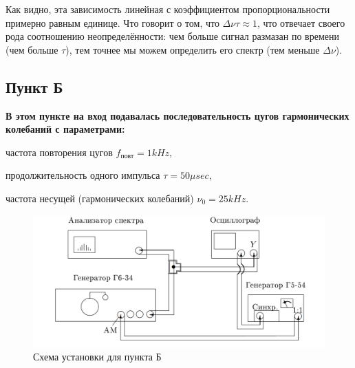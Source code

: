 \documentclass[a4paper,12pt]{article}
\begin{document}
Как видно, эта зависимость линейная с коэффициентом пропорциональности примерно равным единице. Что говорит о том, что $\Delta \nu \tau \approx 1$, что отвечает своего рода соотношению неопределённости: чем больше сигнал размазан по времени (чем больше $\tau$), тем точнее мы можем определить его спектр (тем меньше $\Delta \nu$).

\bigskip
\subsection*{Пункт Б}
\bigskip

\textbf{В этом пункте на вход подавалась последовательность цугов гармонических колебаний с параметрами:}

частота повторения цугов $f_\text{повт} = 1 kHz$,

продолжительность одного импульса $\tau = 50 \mu sec$,

частота несущей (гармонических колебаний) $\nu_0 = 25 kHz$.

\begin{figure}[htpb]
\centering
\includegraphics[width=160mm]{scheme2.png}
\caption{Схема установки для пункта Б }\label{schema}
\end{figure}
\end{document}
